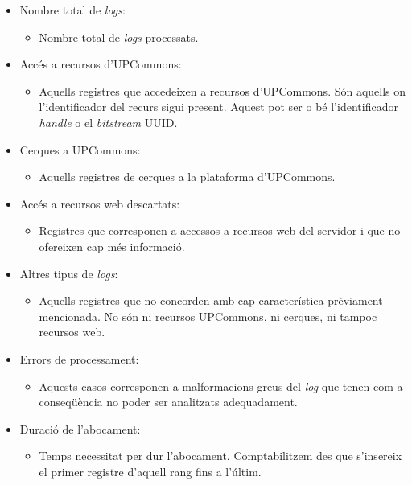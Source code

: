 \begin{itemize}
    \item Nombre total de \textit{\gls{log}s}:
    \begin{itemize}
        \item Nombre total de \textit{logs} processats.
    \end{itemize}
    \item Accés a recursos d'\gls{UPCommons}:
    \begin{itemize}
        \item Aquells registres que accedeixen a recursos d’UPCommons. 
        Són aquells on l'identificador del recurs sigui present.
        Aquest pot ser o bé l'identificador \textit{\gls{handle}} o el \textit{\gls{bitstream}} \gls{UUID}.
    \end{itemize}
    \item Cerques a \gls{UPCommons}:
    \begin{itemize}
        \item Aquells registres de cerques a la plataforma d’\gls{UPCommons}.
    \end{itemize}
    \item Accés a recursos web descartats:
    \begin{itemize}
        \item Registres que corresponen a accessos a recursos web del servidor i que no ofereixen cap més informació.
    \end{itemize}
    \item Altres tipus de \textit{logs}:
    \begin{itemize}
        \item Aquells registres que no concorden amb cap característica prèviament mencionada.
        No són ni recursos \gls{UPCommons}, ni cerques, ni tampoc recursos web.
    \end{itemize}
    \item Errors de processament:
    \begin{itemize}
        \item Aquests casos corresponen a malformacions greus del \textit{\gls{log}} que tenen com a conseqüència no poder ser analitzats adequadament.
    \end{itemize}
    \item Duració de l’abocament:
    \begin{itemize}
        \item Temps necessitat per dur l’abocament.
        Comptabilitzem des que s’insereix el primer registre d’aquell rang fins a l’últim.
    \end{itemize}
\end{itemize}